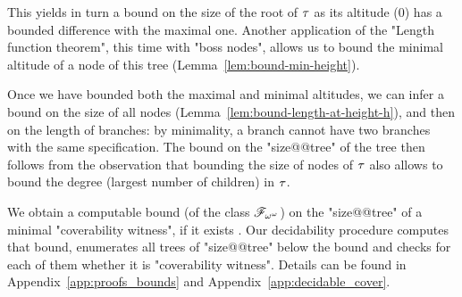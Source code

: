 This yields in turn a bound on the size of the root of $\tau$ as its altitude ($0$) has a bounded difference with the maximal one. Another application of the "Length function theorem", this time with "boss nodes", allows us to bound the minimal altitude of a node of this tree (Lemma~\ref{lem:bound-min-height}).
	
Once we have bounded both the maximal and minimal altitudes, we can infer a bound on the size of all nodes (Lemma~\ref{lem:bound-length-at-height-h}), and then on the length of branches: by minimality, a branch cannot have two branches with the same specification. 
The bound on the "size@@tree" of the tree then follows from the observation that bounding the size of nodes of $\tau$ also allows to bound the degree (largest number of children) in $\tau$.
 



We obtain a computable bound (of the class $\mathscr{F}_{\omega^\omega}$) on the "size@@tree" of a minimal "coverability witness", if it exists . Our decidability procedure computes that bound, enumerates all trees of "size@@tree" below the bound and checks for each of them whether it is "coverability witness". Details can be found in Appendix~\ref{app:proofs_bounds} and Appendix~\ref{app:decidable_cover}.

\decidablecover*


